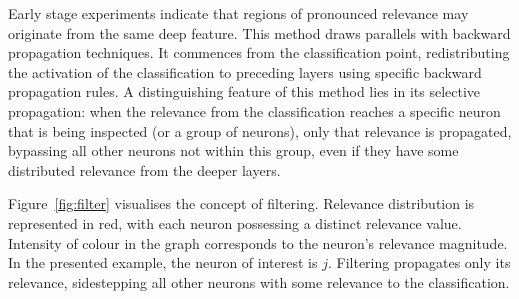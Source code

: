 Early stage experiments indicate that regions of pronounced relevance may originate from the same deep feature. This method draws parallels with backward propagation techniques. It commences from the classification point, redistributing the activation of the classification to preceding layers using specific backward propagation rules. A distinguishing feature of this method lies in its selective propagation: when the relevance from the classification reaches a specific neuron that is being inspected (or a group of neurons), only that relevance is propagated, bypassing all other neurons not within this group, even if they have some distributed relevance from the deeper layers.

Figure~\ref{fig:filter} visualises the concept of filtering. Relevance distribution is represented in red, with each neuron possessing a distinct relevance value. Intensity of colour in the graph corresponds to the neuron's relevance magnitude. In the presented example, the neuron of interest is $j$. Filtering propagates only its relevance, sidestepping all other neurons with some relevance to the classification.

